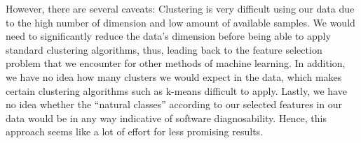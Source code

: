 \documentclass{scrartcl}
\begin{document}
However, there are several caveats: Clustering is very difficult using our data
due to the high number of dimension and low amount of available samples. We
would need to significantly reduce the data's dimension before being able to
apply standard clustering algorithms, thus, leading back to the feature
selection problem that we encounter for other methods of machine learning. In
addition, we have no idea how many clusters we would expect in the data, which
makes certain clustering algorithms such as k-means difficult to apply. Lastly,
we have no idea whether the \enquote{natural classes} according to our selected
features in our data would be in any way indicative of software diagnosability.
Hence, this approach seems like a lot of effort for less promising results.
\end{document}
